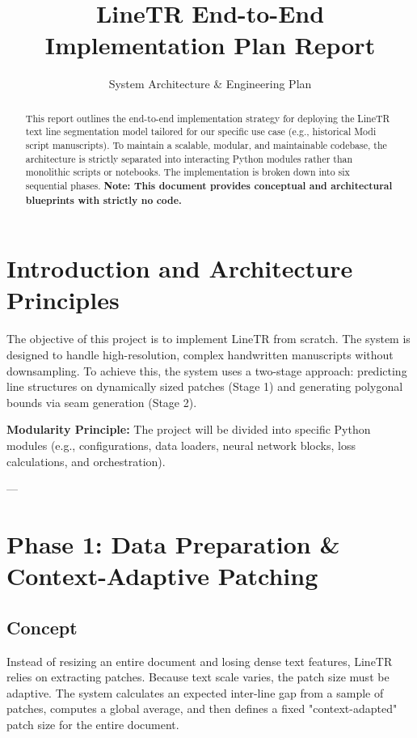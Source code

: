 \documentclass[12pt,a4paper]{article}
\title{\textbf{LineTR End-to-End Implementation Plan Report}}
\author{System Architecture \& Engineering Plan}
\date{}
\begin{document}
\maketitle

\begin{abstract}
This report outlines the end-to-end implementation strategy for deploying the LineTR text line segmentation model tailored for our specific use case (e.g., historical Modi script manuscripts). To maintain a scalable, modular, and maintainable codebase, the architecture is strictly separated into interacting Python modules rather than monolithic scripts or notebooks. The implementation is broken down into six sequential phases. \textbf{Note: This document provides conceptual and architectural blueprints with strictly no code.}
\end{abstract}

\tableofcontents
\newpage

\section{Introduction and Architecture Principles}
The objective of this project is to implement LineTR from scratch. The system is designed to handle high-resolution, complex handwritten manuscripts without downsampling. To achieve this, the system uses a two-stage approach: predicting line structures on dynamically sized patches (Stage 1) and generating polygonal bounds via seam generation (Stage 2). 

\textbf{Modularity Principle:} The project will be divided into specific Python modules (e.g., configurations, data loaders, neural network blocks, loss calculations, and orchestration).

---

\section{Phase 1: Data Preparation \& Context-Adaptive Patching}

\subsection{Concept}
Instead of resizing an entire document and losing dense text features, LineTR relies on extracting patches. Because text scale varies, the patch size must be adaptive. The system calculates an expected inter-line gap from a sample of patches, computes a global average, and then defines a fixed "context-adapted" patch size for the entire document.
\end{document}
